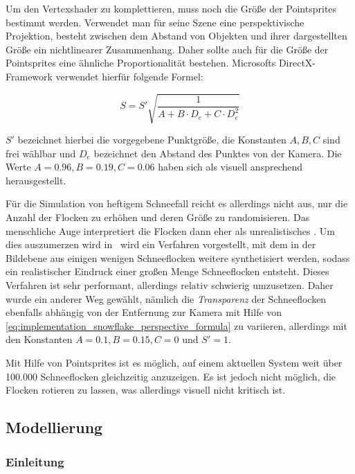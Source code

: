 Um den Vertexshader zu komplettieren, muss noch die Größe der
Pointsprites bestimmt werden. Verwendet man für seine Szene eine
perspektivische Projektion, besteht zwischen dem Abstand von Objekten
und ihrer dargestellten Größe ein nichtlinearer Zusammenhang. Daher
sollte auch für die Größe der Pointsprites eine ähnliche
Proportionalität bestehen. Microsofts DirectX-Framework verwendet
hierfür folgende
Formel\cite{DirectXPointSprites}:

\begin{equation}
\label{eq:implementation_snowflake_perspective_formula}
S =
S'
\sqrt{
  \frac
  {
    1
  }
  {
    A +
    B \cdot D_e +
    C \cdot D_e^2
  }
}
\end{equation}

$S'$ bezeichnet hierbei die vorgegebene Punktgröße, die Konstanten
$A,B,C$ sind frei wählbar und $D_e$ bezeichnet den Abstand des Punktes
von der Kamera. Die Werte $A=0.96,B=0.19,C=0.06$ haben sich als
visuell ansprechend herausgestellt.

Für die Simulation von heftigem Schneefall reicht es allerdings nicht
aus, nur die Anzahl der Flocken zu erhöhen und deren Größe zu
randomisieren. Das menschliche Auge interpretiert die Flocken dann
eher als unrealistisches . Um dies auszumerzen
wird in~\cite{Langer2004} wird ein Verfahren vorgestellt, mit dem in
der Bildebene aus einigen wenigen Schneeflocken weitere synthetisiert
werden, sodass ein realistischer Eindruck einer großen Menge
Schneeflocken entsteht. Dieses Verfahren ist sehr performant,
allerdings relativ schwierig umzusetzen. Daher wurde ein anderer Weg
gewählt, nämlich die \emph{Transparenz} der Schneeflocken ebenfalls
abhängig von der Entfernung zur Kamera mit Hilfe von
\cref{eq:implementation_snowflake_perspective_formula} zu
variieren, allerdings mit den Konstanten $A=0.1,B=0.15,C=0$ und
$S'=1$.

Mit Hilfe von Pointsprites ist es möglich, auf einem aktuellen System
weit über 100.000 Schneeflocken gleichzeitig anzuzeigen. Es ist jedoch
nicht möglich, die Flocken rotieren zu lassen, was allerdings visuell
nicht kritisch ist.

\subsection{Modellierung}

\subsubsection{Einleitung}

